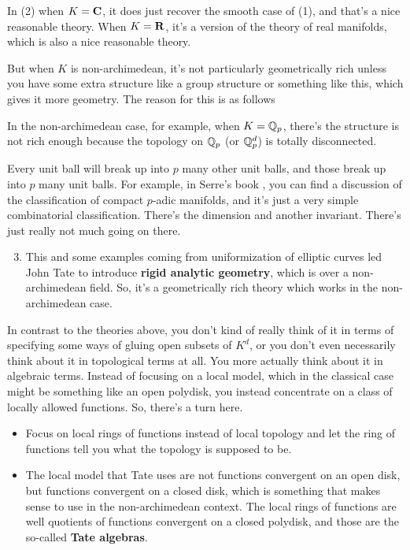 In (2) when $K = \mathbf C$, it does just recover the smooth case of (1), and that's a nice reasonable theory. When $K = \mathbf R$, it's a version of the theory of real manifolds, which is also a nice reasonable theory. 

But when $K$ is non-archimedean, it's not particularly geometrically rich unless you have some extra structure like a group structure or something like this, which gives it more geometry. The reason for this is as follows 



In the non-archimedean case, for example, when $K=\Bbb{Q}_p$, there's the structure is not rich enough because the topology on $\Bbb{Q}_p$ (or $\Bbb{Q}_p^{d}$) is totally disconnected.

\begin{remark}
    Every unit ball will break up into $p$ many other unit balls, and those break up into $p$ many unit balls. For example, in Serre's book \citeme{}, you can find a discussion of the classification of compact $p$-adic manifolds, and it's just a very simple combinatorial classification. There's the dimension and another invariant. There's just really not much going on there.
\end{remark}
    
\begin{enumerate}
    \setcounter{enumi}{2} 
    
    \item  This and some examples coming from uniformization of elliptic curves led John Tate \citeme{} to introduce \textbf{rigid analytic geometry}, which is over a non-archimedean field. So, it's a geometrically rich theory which works in the non-archimedean case. 
\end{enumerate}



In contrast to the theories above, you don't kind of really think of it in terms of specifying some ways of gluing open subsets of $K^{d}$, or you don't even necessarily think about it in topological terms at all. You more actually think about it in algebraic terms. Instead of focusing on a local model, which in the classical case might be something like an open polydisk, you instead concentrate on a class of locally allowed functions. So, there's a turn here. 

\begin{itemize}
    \item Focus on local rings of functions instead of local topology and let the ring of functions tell you what the topology is supposed to be.

    \item The local model that Tate uses are not functions convergent on an open disk, but functions convergent on a closed disk, which is something that makes sense to use in the non-archimedean context. The local rings of functions are well quotients of functions convergent on a closed polydisk, and those are the so-called \textbf{Tate algebras}.
\end{itemize}

